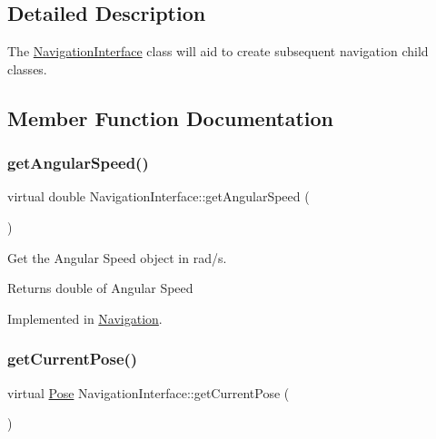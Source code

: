 \subsection{Detailed Description}
The \hyperlink{classNavigationInterface}{Navigation\+Interface} class will aid to create subsequent navigation child classes. 

\subsection{Member Function Documentation}
\mbox{\label{classNavigationInterface_a9fda3919f625414f9fe68dd03deb3130}} 
\subsubsection{\texorpdfstring{get\+Angular\+Speed()}{getAngularSpeed()}}
{\footnotesize\ttfamily virtual double Navigation\+Interface\+::get\+Angular\+Speed (\begin{DoxyParamCaption}{ }\end{DoxyParamCaption})\hspace{0.3cm}{\ttfamily [pure virtual]}}



Get the Angular Speed object in rad/s. 

\begin{DoxyReturn}{Returns}
double of Angular Speed 
\end{DoxyReturn}


Implemented in \hyperlink{classNavigation_a412ff177cefb3c4ddaf87daab3fe4c4c}{Navigation}.

\mbox{\label{classNavigationInterface_ab37e23f5f838c02d7768d2f02b1fe429}} 
\subsubsection{\texorpdfstring{get\+Current\+Pose()}{getCurrentPose()}}
{\footnotesize\ttfamily virtual \hyperlink{structPose}{Pose} Navigation\+Interface\+::get\+Current\+Pose (\begin{DoxyParamCaption}{ }\end{DoxyParamCaption})\hspace{0.3cm}{\ttfamily [pure virtual]}}



